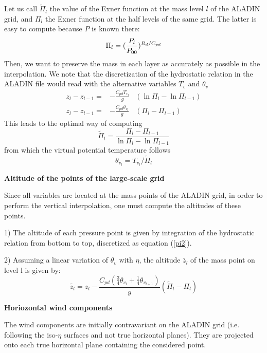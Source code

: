 Let us call $\tilde{\Pi}_l$ the
value of the Exner function at the mass level $l$ of the ALADIN grid, and
$\Pi_l$ the Exner function at the half levels of the same grid. The
latter is easy to compute because $P$ is known there:
\begin{equation}
\Pi_l= ({ P_l \over P_{00} })^{ R_d / C_{pd}}
\end{equation}
Then, we want to preserve the mass in each layer as accurately as possible
in the interpolation. We note that the discretization of the
hydrostatic relation in the ALADIN file would read with the alternative
variables $T_v$ and $\theta_v$
\begin{eqnarray}
\label{pi1}
z_l-z_{l-1}=&-\frac{C_{pd}T_{v_l}}{g}&(\ln\Pi_l-\ln\Pi_{l-1})\\
\label{pi2}
z_l-z_{l-1}=&-\frac{C_{pd}\theta_{v_l}}{g}&(\Pi_l-\Pi_{l-1})
\end{eqnarray}
This leads to the optimal way of computing
\begin{equation}
\tilde\Pi_l=\frac{\Pi_l-\Pi_{l-1}}{\ln\Pi_l-\ln\Pi_{l-1}}
\end{equation}
from which the virtual potential temperature follows
\begin{equation}
\theta_{v_l} = T_{v_l} / \tilde{\Pi}_l
\end{equation}

{\bf Altitude of the points of the large-scale grid}

Since all variables are located at the mass points of the ALADIN grid,
in order to perform the vertical interpolation, one must compute the
altitudes of these points.

1) The altitude of each pressure point is given by integration
of the hydrostatic relation from bottom to top, discretized as equation
(\ref{pi2}).

2) Assuming a linear variation of $\theta_v$ with $\eta$,
the altitude $\tilde{z_l}$
of the mass point on level l is given by:
\begin{equation}
\tilde{z_l}=z_l-\frac{C_{pd}\left( \frac{3}{4}\theta_{v_l}
+\frac{1}{4}\theta_{v_{l+1}}\right)}{g}(\tilde\Pi_l-\Pi_l)
\end{equation}

{\bf Horiozontal wind components}

The wind components are initially contravariant on the ALADIN grid
(i.e. following the iso-$\eta$ surfaces and not true horizontal planes).
They are projected onto each true horizontal plane containing the considered
point.\\

